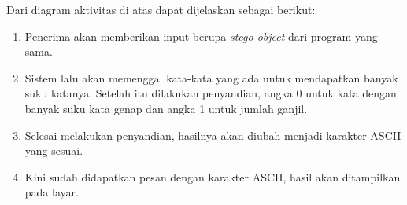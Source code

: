 Dari diagram aktivitas di atas dapat dijelaskan sebagai berikut:

\begin{enumerate}
	\item Penerima akan memberikan input berupa \textit{stego-object} dari program yang sama.
	\item Sistem lalu akan memenggal kata-kata yang ada untuk mendapatkan banyak suku katanya. Setelah itu dilakukan penyandian, angka 0 untuk kata dengan banyak suku kata genap dan angka 1 untuk jumlah ganjil.
	\item Selesai melakukan penyandian, hasilnya akan diubah menjadi karakter ASCII yang sesuai.
	\item Kini sudah didapatkan pesan dengan karakter ASCII, hasil akan ditampilkan pada layar.
\end{enumerate}